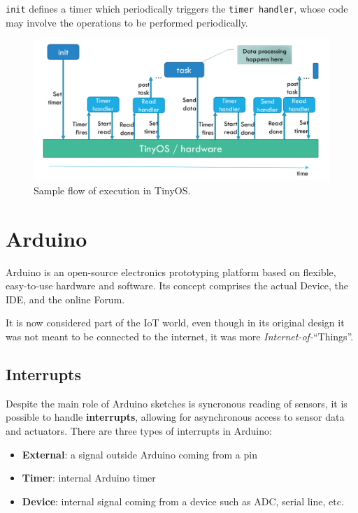 \texttt{init} defines a timer which periodically triggers the \texttt{timer handler}, whose code may involve the operations to be performed periodically.

\begin{figure}[htbp]
   \centering
   \includegraphics{images/tinyos_model.png}
   \caption{Sample flow of execution in TinyOS.}
   \label{fig:tinyos_model}
\end{figure}

\section{Arduino}

Arduino is an open-source electronics prototyping platform based on flexible, easy-to-use hardware and software. Its concept comprises the actual Device, the IDE, and the online Forum.

It is now considered part of the IoT world, even though in its original design it was not meant to be connected to the internet, it was more \textsl{Internet-of-}``Things''.


\subsection{Interrupts}
Despite the main role of Arduino sketches is syncronous reading of sensors, it is possible to handle \textbf{interrupts}, allowing for asynchronous access to sensor data and actuators.
There are three types of interrupts in Arduino:
\begin{itemize}
   \item \textbf{External}:
   a signal outside Arduino coming from a pin
   \item \textbf{Timer}:
   internal Arduino timer 
   \item \textbf{Device}:
   internal signal coming from a device such as ADC, serial line, etc.
\end{itemize}

